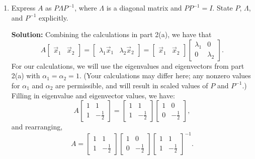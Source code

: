 \documentclass[10pt]{article}
\theoremstyle{definition}
\theoremstyle{plain}
\begin{document}
\begin{enumerate}[label=(\alph*)]
\item Express $A$ as $P\Lambda P^{-1}$, where $\Lambda$ is a diagonal matrix and $PP^{-1} = I$. State $P$, $\Lambda$, and $P^{-1}$ explicitly.

\textbf{Solution:} Combining the calculations in part 2(a), we have that
\begin{equation}
A \begin{bmatrix} \vec{x}_1 & \vec{x}_2 \end{bmatrix} = \begin{bmatrix} \lambda_1 \vec{x}_1 & \lambda_2 \vec{x}_2 \end{bmatrix} = \begin{bmatrix} \vec{x}_1 & \vec{x}_2 \end{bmatrix} \begin{bmatrix} \lambda_1 & 0 \\ 0 & \lambda_2 \end{bmatrix}.
\end{equation}
For our calculations, we will use the eigenvalues and eigenvectors from part 2(a) with $\alpha_1 = \alpha_2 = 1$. (Your calculations may differ here; any nonzero values for $\alpha_1$ and $\alpha_2$ are permissible, and will result in scaled values of $P$ and $P^{-1}$.) Filling in eigenvalue and eigenvector values, we have:
\begin{equation}
A \begin{bmatrix} 1 & 1 \\ 1 & -\frac{1}{2} \end{bmatrix} = \begin{bmatrix} 1 & 1 \\ 1 & -\frac{1}{2} \end{bmatrix} \begin{bmatrix} 1 & 0 \\ 0 & -\frac{1}{2} \end{bmatrix},
\end{equation}
and rearranging,
\begin{equation}
A = \begin{bmatrix} 1 & 1 \\ 1 & -\frac{1}{2} \end{bmatrix} \begin{bmatrix} 1 & 0 \\ 0 & -\frac{1}{2} \end{bmatrix} \begin{bmatrix} 1 & 1 \\ 1 & -\frac{1}{2} \end{bmatrix}^{-1}.
\end{equation}

\end{enumerate}
\end{document}
